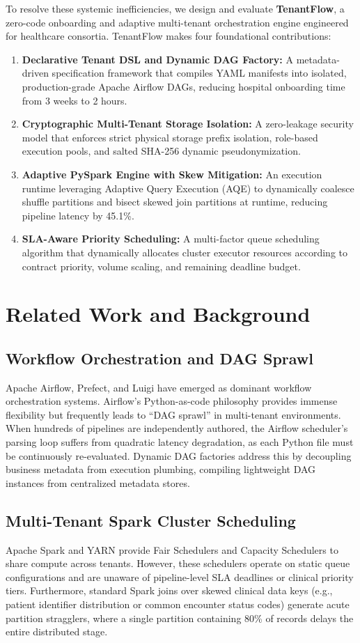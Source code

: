 \documentclass[10pt,journal,compsoc]{IEEEtran}
\begin{document}
To resolve these systemic inefficiencies, we design and evaluate \textbf{TenantFlow}, a zero-code onboarding and adaptive multi-tenant orchestration engine engineered for healthcare consortia. TenantFlow makes four foundational contributions:
\begin{enumerate}
    \item \textbf{Declarative Tenant DSL and Dynamic DAG Factory:} A metadata-driven specification framework that compiles YAML manifests into isolated, production-grade Apache Airflow DAGs, reducing hospital onboarding time from 3 weeks to 2 hours.
    \item \textbf{Cryptographic Multi-Tenant Storage Isolation:} A zero-leakage security model that enforces strict physical storage prefix isolation, role-based execution pools, and salted SHA-256 dynamic pseudonymization.
    \item \textbf{Adaptive PySpark Engine with Skew Mitigation:} An execution runtime leveraging Adaptive Query Execution (AQE) to dynamically coalesce shuffle partitions and bisect skewed join partitions at runtime, reducing pipeline latency by 45.1\%.
    \item \textbf{SLA-Aware Priority Scheduling:} A multi-factor queue scheduling algorithm that dynamically allocates cluster executor resources according to contract priority, volume scaling, and remaining deadline budget.
\end{enumerate}

\section{Related Work and Background}
\subsection{Workflow Orchestration and DAG Sprawl}
Apache Airflow, Prefect, and Luigi have emerged as dominant workflow orchestration systems. Airflow's Python-as-code philosophy provides immense flexibility but frequently leads to ``DAG sprawl'' in multi-tenant environments. When hundreds of pipelines are independently authored, the Airflow scheduler's parsing loop suffers from quadratic latency degradation, as each Python file must be continuously re-evaluated. Dynamic DAG factories address this by decoupling business metadata from execution plumbing, compiling lightweight DAG instances from centralized metadata stores.

\subsection{Multi-Tenant Spark Cluster Scheduling}
Apache Spark and YARN provide Fair Schedulers and Capacity Schedulers to share compute across tenants. However, these schedulers operate on static queue configurations and are unaware of pipeline-level SLA deadlines or clinical priority tiers. Furthermore, standard Spark joins over skewed clinical data keys (e.g., patient identifier distribution or common encounter status codes) generate acute partition stragglers, where a single partition containing 80\% of records delays the entire distributed stage.
\end{document}
